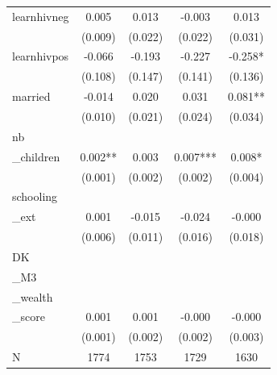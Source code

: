 \begin{tabular}{lcccc}
\hline
learnhivneg & 0.005 & 0.013 & -0.003 & 0.013 \\
 & (0.009) & (0.022) & (0.022) & (0.031) \\
learnhivpos & -0.066 & -0.193 & -0.227 & -0.258* \\
 & (0.108) & (0.147) & (0.141) & (0.136) \\
married & -0.014 & 0.020 & 0.031 & 0.081** \\
 & (0.010) & (0.021) & (0.024) & (0.034) \\
nb\\_children & 0.002** & 0.003 & 0.007*** & 0.008* \\
 & (0.001) & (0.002) & (0.002) & (0.004) \\
schooling\\_ext & 0.001 & -0.015 & -0.024 & -0.000 \\
 & (0.006) & (0.011) & (0.016) & (0.018) \\
DK\\_M3\\_wealth\\_score & 0.001 & 0.001 & -0.000 & -0.000 \\
 & (0.001) & (0.002) & (0.002) & (0.003) \\
\hline
N & 1774 & 1753 & 1729 & 1630 \\
\hline
\end{tabular}
